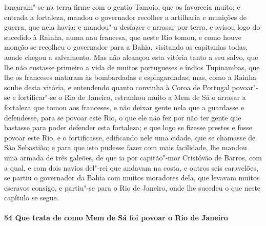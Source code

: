 lançaram"-se na terra firme com o gentio Tamoio, que os favorecia muito; e entrada a
fortaleza, mandou o governador recolher a artilharia e munições de guerra, que nela havia;
e mandou"-a desfazer e arrasar por terra, e avisou logo do sucedido à Rainha, numa nau
francesa, que neste Rio tomou, e como houve monção se recolheu o governador para a Bahia,
visitando as capitanias todas, aonde chegou a salvamento. Mas não alcançou esta vitória
tanto a seu salvo, que lhe não custasse primeiro a vida de muitos portugueses e índios
Tupinambas, que lhe os franceses mataram às bombardadas e espingardadas; mas, como a
Rainha soube desta vitória, e entendendo quanto convinha à Coroa de Portugal povoar"-se e
fortificar"-se o Rio de Janeiro, estranhou muito a Mem de Sá o arrasar a fortaleza que
tomou aos franceses, e não deixar gente nela que a guardasse e defendesse, para se povoar
este Rio, o que ele não fez por não ter gente que bastasse para poder defender esta
fortaleza; e que logo se fizesse prestes e fosse povoar este Rio, e o fortificasse,
edificando nele uma cidade, que se chamasse de São Sebastião; e para que isto pudesse
fazer com mais facilidade, lhe mandou uma armada de três galeões, de que ia por
capitão"-mor Cristóvão de Barros, com a qual, e com dois navios del"-rei que andavam na
costa, e outros seis caravelões, se partiu o governador da Bahia com muitos moradores
dela, que levavam muitos escravos consigo, e partiu"-se para o Rio de Janeiro, onde lhe
sucedeu o que neste capítulo se segue.

\paragraph{54 Que trata de como Mem de Sá foi povoar o Rio de Janeiro}

